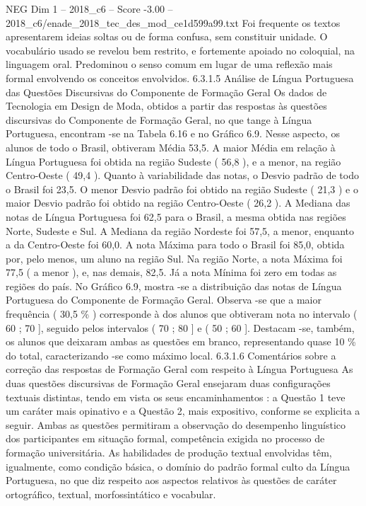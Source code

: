 \begin{textsample}{NEG Dim 1 – 2018\_c6 – Score -3.00 – 2018\_c6/enade\_2018\_tec\_des\_mod\_ce1d599a99.txt}
Foi frequente os textos apresentarem ideias soltas ou de forma confusa, sem constituir unidade.
O vocabulário usado se revelou bem restrito, e fortemente apoiado no coloquial, na linguagem oral.
Predominou o senso comum em lugar de uma reflexão mais formal envolvendo os conceitos envolvidos. 6.3.1.5 Análise de Língua Portuguesa das Questões Discursivas do Componente de Formação Geral Os dados de Tecnologia em Design de Moda, obtidos a partir das respostas às questões discursivas do Componente de Formação Geral, no que tange à Língua Portuguesa, encontram -se na Tabela 6.16 e no Gráfico 6.9.
Nesse aspecto, os alunos de todo o Brasil, obtiveram Média 53,5.
A maior Média em relação à Língua Portuguesa foi obtida na região Sudeste ( 56,8 ), e a menor, na região Centro-Oeste ( 49,4 ).
Quanto à variabilidade das notas, o Desvio padrão de todo o Brasil foi 23,5.
O menor Desvio padrão foi obtido na região Sudeste ( 21,3 ) e o maior Desvio padrão foi obtido na região Centro-Oeste ( 26,2 ).
A Mediana das notas de Língua Portuguesa foi 62,5 para o Brasil, a mesma obtida nas regiões Norte, Sudeste e Sul.
A Mediana da região Nordeste foi 57,5, a menor, enquanto a da Centro-Oeste foi 60,0.
A nota Máxima para todo o Brasil foi 85,0, obtida por, pelo menos, um aluno na região Sul.
Na região Norte, a nota Máxima foi 77,5 ( a menor ), e, nas demais, 82,5.
Já a nota Mínima foi zero em todas as regiões do país.
No Gráfico 6.9, mostra -se a distribuição das notas de Língua Portuguesa do Componente de Formação Geral.
Observa -se que a maior frequência ( 30,5 \% ) corresponde à dos alunos que obtiveram nota no intervalo ( 60 ; 70 ], seguido pelos intervalos ( 70 ; 80 ] e ( 50 ; 60 ].
Destacam -se, também, os alunos que deixaram ambas as questões em branco, representando quase 10 \% do total, caracterizando -se como máximo local. 6.3.1.6 Comentários sobre a correção das respostas de Formação Geral com respeito à Língua Portuguesa As duas questões discursivas de Formação Geral ensejaram duas configurações textuais distintas, tendo em vista os seus encaminhamentos : a Questão 1 teve um caráter mais opinativo e a Questão 2, mais expositivo, conforme se explicita a seguir.
Ambas as questões permitiram a observação do desempenho linguístico dos participantes em situação formal, competência exigida no processo de formação universitária.
As habilidades de produção textual envolvidas têm, igualmente, como condição básica, o domínio do padrão formal culto da Língua Portuguesa, no que diz respeito aos aspectos relativos às questões de caráter ortográfico, textual, morfossintático e vocabular.

\end{textsample}
